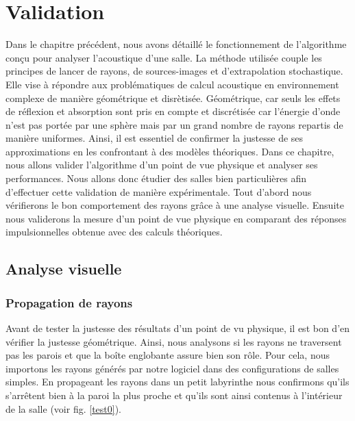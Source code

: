 \chapter{Validation}
	\minitoc
	\newpage
	

Dans le chapitre précédent, nous avons détaillé le fonctionnement de l'algorithme conçu pour analyser l'acoustique d'une salle. La méthode utilisée couple les principes de lancer de rayons, de sources-images et d'extrapolation stochastique. Elle vise à répondre aux problématiques de calcul acoustique en environnement complexe de manière géométrique et disrètisée. Géométrique, car seuls les effets de réflexion et absorption sont pris en compte et discrétisée car l'énergie d'onde n'est pas portée par une sphère mais par un grand nombre de rayons repartis de manière uniformes. Ainsi, il est essentiel de confirmer la justesse de ses approximations en les confrontant à des modèles théoriques. Dans ce chapitre, nous allons valider l'algorithme d'un point de vue physique et analyser ses performances. Nous allons donc étudier des salles bien particulières afin d'effectuer cette validation de manière expérimentale. Tout d'abord nous vérifierons le bon comportement des rayons grâce à une analyse visuelle. Ensuite nous validerons la mesure d'un point de vue physique en comparant des réponses impulsionnelles obtenue avec des calculs théoriques.

\section{Analyse visuelle}
\subsection{Propagation de rayons}

Avant de tester la justesse des résultats d'un point de vu physique, il est bon d'en vérifier la justesse géométrique. Ainsi, nous analysons si les rayons ne traversent pas les parois et que la boîte englobante assure bien son rôle. Pour cela, nous importons les rayons générés par notre logiciel dans des configurations de salles simples. En propageant les rayons dans un petit labyrinthe nous confirmons qu'ils s'arrêtent bien à la paroi la plus proche et qu'ils sont ainsi contenus à l'intérieur de la salle (voir fig. \ref{test0}). 


